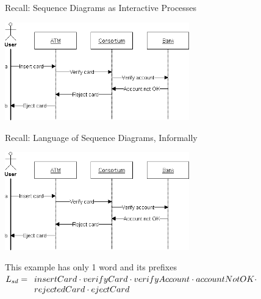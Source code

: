\documentclass[aspectratio=169]{beamer}
\begin{document}
\begin{slide}{Recall: Sequence Diagrams as Interactive Processes}
  \centering

  \includegraphics[width=0.6\textwidth]{images/sd-simple-atm.png}

\end{slide}

\begin{slide}{Recall: Language of Sequence Diagrams, Informally}
  \centering

  \includegraphics[width=0.6\textwidth]{images/sd-simple-atm.png}

  \begin{exampleblock}{This example has only 1 word and its prefixes}
   $L_{sd} = \begin{array}[t]{l}
      insertCard \cdot verifyCard \cdot verifyAccount \cdot accountNotOK \cdot \\ rejectedCard \cdot ejectCard
      \end{array}$
  \end{exampleblock}
\end{slide}
\end{document}
